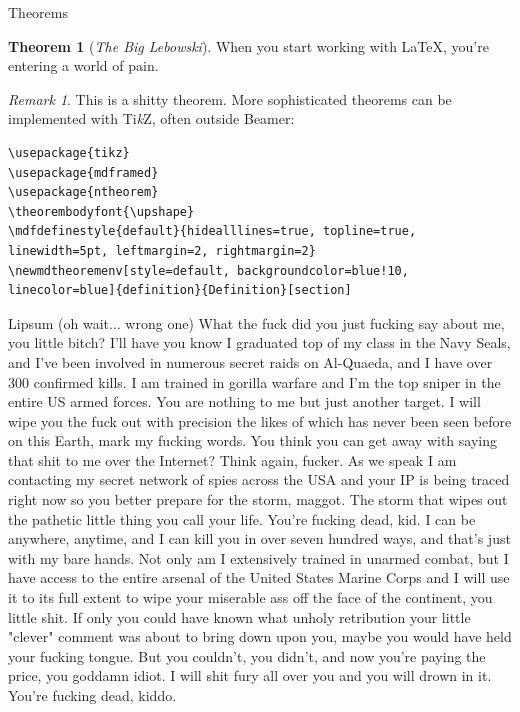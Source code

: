 \documentclass{beamer}
\theoremstyle{definition}
\newtheorem{thm}{Theorem}
\theoremstyle{remark}
\newtheorem{remark}{Remark}
\begin{document}
\begin{frame}[fragile]{Theorems}
\begin{thm}[\textit{The Big Lebowski}]
When you start working with {\LaTeX}, you're entering a world of pain.
\end{thm}
\begin{remark}
This is a shitty theorem. More sophisticated theorems can be implemented with Ti\textit{k}Z, often outside Beamer:
\end{remark}
\begin{verbatim}
\usepackage{tikz}
\usepackage{mdframed}
\usepackage{ntheorem}
\theorembodyfont{\upshape}
\mdfdefinestyle{default}{hidealllines=true, topline=true, 
linewidth=5pt, leftmargin=2, rightmargin=2}
\newmdtheoremenv[style=default, backgroundcolor=blue!10, 
linecolor=blue]{definition}{Definition}[section]
\end{verbatim}
\end{frame}

\begin{frame}{Lipsum (oh wait... wrong one)}
What the fuck did you just fucking say about me, you little bitch? I'll have you know I graduated top of my class in the Navy Seals, and I've been involved in numerous secret raids on Al-Quaeda, and I have over 300 confirmed kills. I am trained in gorilla warfare and I'm the top sniper in the entire US armed forces. You are nothing to me but just another target. I will wipe you the fuck out with precision the likes of which has never been seen before on this Earth, mark my fucking words. You think you can get away with saying that shit to me over the Internet? Think again, fucker. As we speak I am contacting my secret network of spies across the USA and your IP is being traced right now so you better prepare for the storm, maggot. The storm that wipes out the pathetic little thing you call your life. You're fucking dead, kid. I can be anywhere, anytime, and I can kill you in over seven hundred ways, and that's just with my bare hands. Not only am I extensively trained in unarmed combat, but I have access to the entire arsenal of the United States Marine Corps and I will use it to its full extent to wipe your miserable ass off the face of the continent, you little shit. If only you could have known what unholy retribution your little "clever" comment was about to bring down upon you, maybe you would have held your fucking tongue. But you couldn't, you didn't, and now you're paying the price, you goddamn idiot. I will shit fury all over you and you will drown in it. You're fucking dead, kiddo.
\end{frame}
\end{document}
